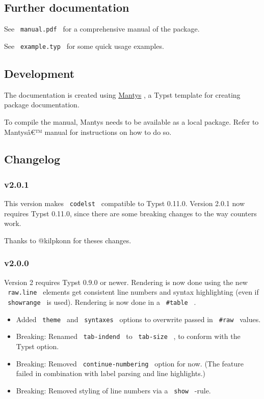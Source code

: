 \subsection{Further documentation}\label{further-documentation}

See \texttt{\ manual.pdf\ } for a comprehensive manual of the package.

See \texttt{\ example.typ\ } for some quick usage examples.

\subsection{Development}\label{development}

The documentation is created using
\href{https://github.com/jneug/typst-mantys}{Mantys} , a Typst template
for creating package documentation.

To compile the manual, Mantys needs to be available as a local package.
Refer to Mantysâ€™ manual for instructions on how to do so.

\subsection{Changelog}\label{changelog}

\subsubsection{v2.0.1}\label{v2.0.1}

This version makes \texttt{\ codelst\ } compatible to Typst 0.11.0.
Version 2.0.1 now requires Typst 0.11.0, since there are some breaking
changes to the way counters work.

Thanks to @kilpkonn for theses changes.

\subsubsection{v2.0.0}\label{v2.0.0}

Version 2 requires Typst 0.9.0 or newer. Rendering is now done using the
new \texttt{\ raw.line\ } elements get consistent line numbers and
syntax highlighting (even if \texttt{\ showrange\ } is used). Rendering
is now done in a \texttt{\ \#table\ } .

\begin{itemize}
\tightlist
\item
  Added \texttt{\ theme\ } and \texttt{\ syntaxes\ } options to
  overwrite passed in \texttt{\ \#raw\ } values.
\item
  Breaking: Renamed \texttt{\ tab-indend\ } to \texttt{\ tab-size\ } ,
  to conform with the Typst option.
\item
  Breaking: Removed \texttt{\ continue-numbering\ } option for now. (The
  feature failed in combination with label parsing and line highlights.)
\item
  Breaking: Removed styling of line numbers via a \texttt{\ show\ }
  -rule.
\end{itemize}

